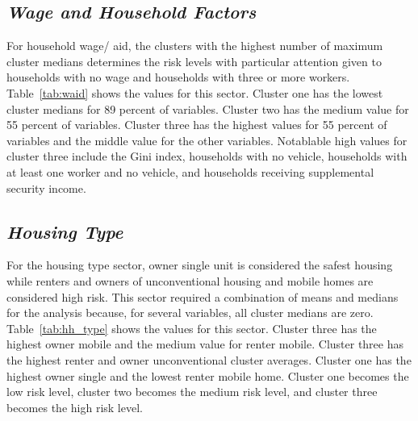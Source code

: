 

\subsection{\textit{Wage and Household Factors}}

For household wage/ aid, the clusters with the highest number of maximum cluster medians determines the risk levels with particular attention given to households with no wage and households with three or more workers. Table~\ref{tab:waid} shows the values for this sector. Cluster one has the lowest cluster medians for 89 percent of variables. Cluster two has the medium value for 55 percent of variables. Cluster three has the highest values for 55 percent of variables and the middle value for the other variables. Notablable high values for cluster three include the Gini index, households with no vehicle, households with at least one worker and no vehicle, and households receiving supplemental security income.  



\subsection{\textit{Housing Type}}
For the housing type sector, owner single unit is considered the safest housing while renters and owners of unconventional housing and mobile homes are considered high risk. This sector required a combination of means and medians for the analysis because, for several variables, all cluster medians are zero. Table~\ref{tab:hh_type} shows the values for this sector. Cluster three has the highest owner mobile and the medium value for renter mobile. Cluster three has the highest renter and owner unconventional cluster averages. Cluster one has the highest owner single and the lowest renter mobile home. Cluster one becomes the low risk level, cluster two becomes the medium risk level, and cluster three becomes the high risk level.





